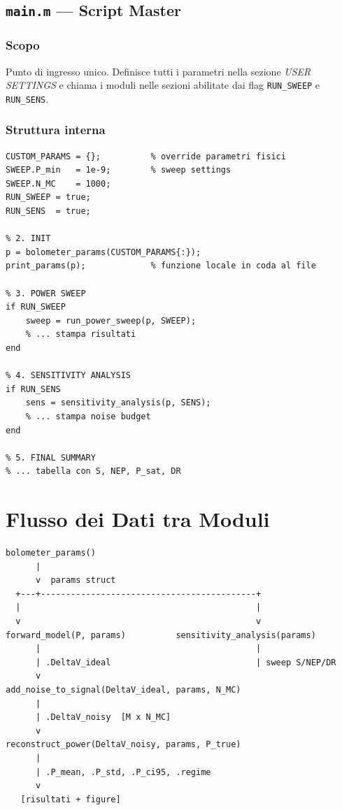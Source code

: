 \documentclass[11pt,a4paper]{article}
\begin{document}
\subsection{\texttt{main.m} --- Script Master}

\subsubsection*{Scopo}
Punto di ingresso unico. Definisce tutti i parametri nella sezione
\emph{USER SETTINGS} e chiama i moduli nelle sezioni abilitate dai flag
\texttt{RUN\_SWEEP} e \texttt{RUN\_SENS}.

\subsubsection*{Struttura interna}
\begin{lstlisting}[caption={Struttura di main.m}]
% 1. USER SETTINGS
CUSTOM_PARAMS = {};          % override parametri fisici
SWEEP.P_min   = 1e-9;        % sweep settings
SWEEP.N_MC    = 1000;
RUN_SWEEP = true;
RUN_SENS  = true;

% 2. INIT
p = bolometer_params(CUSTOM_PARAMS{:});
print_params(p);             % funzione locale in coda al file

% 3. POWER SWEEP
if RUN_SWEEP
    sweep = run_power_sweep(p, SWEEP);
    % ... stampa risultati
end

% 4. SENSITIVITY ANALYSIS
if RUN_SENS
    sens = sensitivity_analysis(p, SENS);
    % ... stampa noise budget
end

% 5. FINAL SUMMARY
% ... tabella con S, NEP, P_sat, DR
\end{lstlisting}

\section{Flusso dei Dati tra Moduli}

\begin{verbatim}
bolometer_params()
      |
      v  params struct
  +---+-------------------------------------------+
  |                                               |
  v                                               v
forward_model(P, params)          sensitivity_analysis(params)
      |                                           |
      | .DeltaV_ideal                             | sweep S/NEP/DR
      v
add_noise_to_signal(DeltaV_ideal, params, N_MC)
      |
      | .DeltaV_noisy  [M x N_MC]
      v
reconstruct_power(DeltaV_noisy, params, P_true)
      |
      | .P_mean, .P_std, .P_ci95, .regime
      v
   [risultati + figure]
\end{verbatim}
\end{document}
